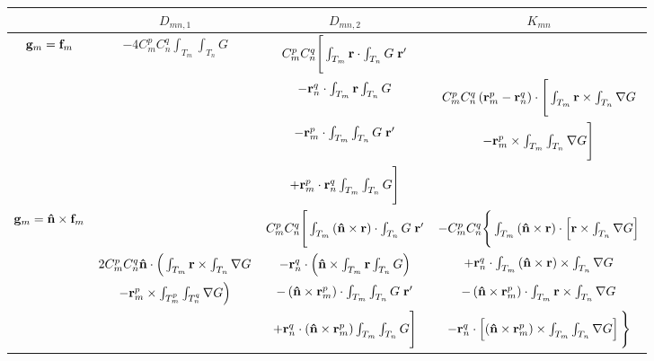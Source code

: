 \begin{table}[h!]
\centering
\begin{tabular}{|c||c|c|c|}
  \hline
& $D_{mn,1}$ & $D_{mn,2}$ & $K_{mn}$ \\
  \hline
\multirow{4}{*}{$\mathbf{g}_m = \mathbf{f}_m$} & \multirow{4}{*}{$-4 C_m^p C_n^q \int_{T_m} \int_{T_n} G$} & $C_m^p C_n^q  \Bigg[\int_{T_m} \mathbf{r} \cdot \int_{T_n} G \; \mathbf{r}'$ & \\
& & $- \mathbf{r}_n^q \cdot \int_{T_m} \mathbf{r} \int_{T_n} G$ & $C_m^p C_n^q \left(\mathbf{r}_m^p - \mathbf{r}_n^q\right) \cdot \Bigg[\int_{T_m} \mathbf{r} \times \int_{T_n} \nabla G$ \\
& & $- \mathbf{r}_m^p  \cdot \int_{T_m} \int_{T_n} G \; \mathbf{r}'$ & $- \mathbf{r}_m^p \times \int_{T_m} \int_{T_n}\nabla G \Bigg]$\\
& & $+ \mathbf{r}_m^p \cdot \mathbf{r}_n^q \int_{T_m} \int_{T_n} G \Bigg]$ & \\
  \hline
\multirow{4}{*}{$\mathbf{g}_m = \mathbf{\Hat{n}}\times\mathbf{f}_m$} &  & $C_m^p C_n^q  \Bigg[\int_{T_m} \left(\mathbf{\Hat{n}} \times \mathbf{r} \right) \cdot \int_{T_n} G \; \mathbf{r}'$ & $-C_m^p C_n^q \Bigg\{ \int_{T_m} \left(\mathbf{\Hat{n}} \times \mathbf{r}\right) \cdot \left[\mathbf{r} \times \int_{T_n} \nabla G \right]$\\
& $2C_m^p C_n^q\mathbf{\Hat{n}} \cdot \Big(\int_{T_m} \mathbf{r} \times \int_{T_n} \nabla G$ & $- \mathbf{r}_n^q \cdot \left(\mathbf{\Hat{n}} \times \int_{T_m} \mathbf{r} \int_{T_n} G \right) $ & $+ \mathbf{r}_n^q \cdot \int_{T_m} \left(\mathbf{\Hat{n}} \times \mathbf{r}\right) \times \int_{T_n} \nabla G$\\
& $- \mathbf{r}_m^p \times \int_{T_m^p} \int_{T_n^q} \nabla G \Big)$ & $- \left(\mathbf{\Hat{n}} \times \mathbf{r}_m^p\right)  \cdot \int_{T_m} \int_{T_n} G \; \mathbf{r}'$ & $- \left(\mathbf{\Hat{n}}\times\mathbf{r}_m^p \right) \cdot \int_{T_m} \mathbf{r} \times \int_{T_n} \nabla G$\\
& & $+ \mathbf{r}_n^q \cdot \left(\mathbf{\Hat{n}} \times \mathbf{r}_m^p\right) \int_{T_m} \int_{T_n} G \Bigg]$ & $-\mathbf{r}_n^q \cdot \left[\left(\mathbf{\Hat{n}} \times \mathbf{r}_m^p \right) \times \int_{T_m} \int_{T_n}\nabla G \right]\Bigg\}$\\
  \hline

\end{tabular}
\end{table}


